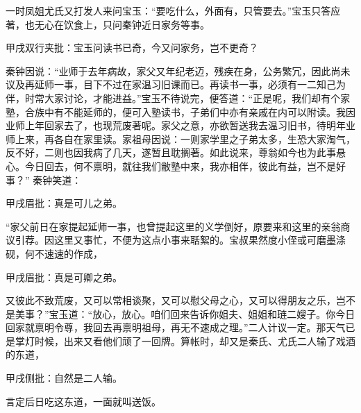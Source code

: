 \begin{parag}
    一时凤姐尤氏又打发人来问宝玉：“要吃什么，外面有，只管要去。”宝玉只答应著，也无心在饮食上，只问秦钟近日家务等事。\begin{note}甲戌双行夹批：宝玉问读书已奇，今又问家务，岂不更奇？\end{note}秦钟因说：“业师于去年病故，家父又年纪老迈，残疾在身，公务繁冗，因此尚未议及再延师一事，目下不过在家温习旧课而已。再读书一事，必须有一二知己为伴，时常大家讨论，才能进益。”宝玉不待说完，便答道：“正是呢，我们却有个家塾，合族中有不能延师的，便可入塾读书，子弟们中亦有亲戚在内可以附读。我因业师上年回家去了，也现荒废著呢。家父之意，亦欲暂送我去温习旧书，待明年业师上来，再各自在家里读。家祖母因说：一则家学里之子弟太多，生恐大家淘气，反不好，二则也因我病了几天，遂暂且耽搁著。如此说来，尊翁如今也为此事悬心。今日回去，何不禀明，就往我们敝塾中来，我亦相伴，彼此有益，岂不是好事？” 秦钟笑道：\begin{note}甲戌眉批：真是可儿之弟。\end{note}“家父前日在家提起延师一事，也曾提起这里的义学倒好，原要来和这里的亲翁商议引荐。因这里又事忙，不便为这点小事来聒絮的。宝叔果然度小侄或可磨墨涤砚，何不速速的作成，\begin{note}甲戌眉批：真是可卿之弟。\end{note}又彼此不致荒废，又可以常相谈聚，又可以慰父母之心，又可以得朋友之乐，岂不是美事？”宝玉道：“放心，放心。咱们回来告诉你姐夫、姐姐和琏二嫂子。你今日回家就禀明令尊，我回去再禀明祖母，再无不速成之理。”二人计议一定。那天气已是掌灯时候，出来又看他们顽了一回牌。算帐时，却又是秦氏、尤氏二人输了戏酒的东道，\begin{note}甲戌侧批：自然是二人输。\end{note}言定后日吃这东道，一面就叫送饭。
\end{parag}


